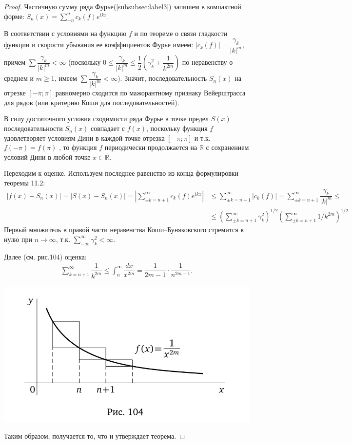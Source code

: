 \begin{proof} Частичную сумму ряда Фурье(\ref{subsubsec:label3}) запишем в компактной форме: $S_n(x) = \sum_{-n}^{n} c_k(f)e^{ikx}$.
	
	В соответствии с условиями на функцию $f$ и по теореме о связи гладкости функции и скорости убывания ее коэффициентов Фурье имеем:
	$\left|c_k(f)\right| = \dfrac{\gamma_k}{|k|^m}$, причем $\sum \dfrac{\gamma_k}{|k|^m} < \infty$ (поскольку $0 \leqslant \dfrac{\gamma_k}{|k|^m} \leqslant \dfrac12 \left(\gamma_k^2 + \dfrac{1}{k^{2m}}\right)$ по неравенству о среднем и  $m \geqslant 1$, имеем $\sum \dfrac{\gamma_k}{|k|^m} < \infty$). Значит, последовательность $S_n(x)$ на  отрезке $\left[ -\pi; \pi \right]$ равномерно сходится по мажорантному признаку Вейерштрасса для рядов (или критерию Коши для последовательностей).
	
	В силу достаточного условия сходимости ряда Фурье в точке предел $S(x)$ последовательности $S_n(x)$ совпадает с $f(x)$, поскольку функция $f$ удовлетворяет условиям Дини в каждой точке отрезка $\left[ -\pi; \pi \right]$ и т.к.  	$f(-\pi) = f(\pi)$	, то функция $f$ периодически продолжается на $\mathbb{R}$ с сохранением условий Дини в любой точке $x \in \mathbb{R}$.
	
	Переходим к оценке. Используем последнее равенство из конца формулировки теоремы 11.2:
	\begin{align*}
		|f(x) - S_n(x)| = |S(x) - S_n(x)| = \left|\sum_{\pm k = n + 1}^{\infty} c_k(f)e^{ikx} \right| &\leqslant \sum_{\pm k = n + 1}^{\infty} |c_k(f)| =  \sum_{\pm k = n + 1}^{\infty} \dfrac{\gamma_k}{|k|^m} \leqslant \\
		&\leqslant \left( \sum_{\pm k = n + 1}^{\infty} \gamma_k^2\right)^{1/2} \left( \sum_{\pm k = n + 1}^{\infty} 1/k^{2m}\right)^{1/2}
	\end{align*}	
	Первый множитель в правой части неравенства Коши--Буняковского стремится к нулю при $n \to \infty$, т.к. $\sum_{-\infty}^{\infty} \gamma_k^2 < \infty$. 
	
	Далее (см. рис.104) оценка:
	\begin{align*}
		\sum_{k = n + 1}^{\infty} \dfrac{1}{k^{2m}} \leqslant \int_{n}^{\infty} \dfrac{dx}{x^{2m}} = \dfrac{1}{2m-1} \cdot \dfrac{1}{n^{2m-1}}.
	\end{align*}
	\begin{center}
		\includegraphics[scale=0.5]{img/pic104.png}
	\end{center}
	Таким образом, получается то, что и утверждает теорема.
\end{proof}

